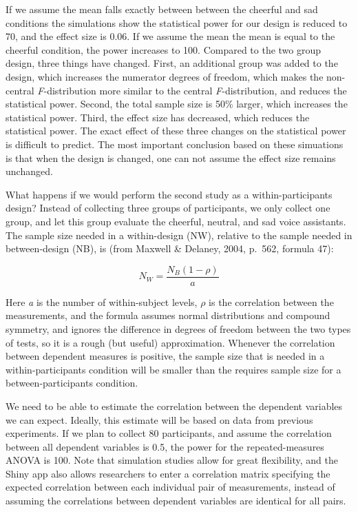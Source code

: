 \documentclass[,man,floatsintext]{apa6}
\begin{document}
If we assume the mean falls exactly between between the cheerful and sad
conditions the simulations show the statistical power for our design is
reduced to 70, and the effect size is 0.06. If we assume the mean the
mean is equal to the cheerful condition, the power increases to 100.
Compared to the two group design, three things have changed. First, an
additional group was added to the design, which increases the numerator
degrees of freedom, which makes the non-central \emph{F}-distribution
more similar to the central \emph{F}-distribution, and reduces the
statistical power. Second, the total sample size is 50\% larger, which
increases the statistical power. Third, the effect size has decreased,
which reduces the statistical power. The exact effect of these three
changes on the statistical power is difficult to predict. The most
important conclusion based on these simuations is that when the design
is changed, one can not assume the effect size remains unchanged.

What happens if we would perform the second study as a
within-participants design? Instead of collecting three groups of
participants, we only collect one group, and let this group evaluate the
cheerful, neutral, and sad voice assistants. The sample size needed in a
within-design (NW), relative to the sample needed in between-design
(NB), is (from Maxwell \& Delaney, 2004, p.~562, formula 47):

\begin{equation}
N_{W}=\frac{N_{B}(1-\rho)}{a}
\end{equation}

Here \emph{a} is the number of within-subject levels, \(\rho\) is the
correlation between the measurements, and the formula assumes normal
distributions and compound symmetry, and ignores the difference in
degrees of freedom between the two types of tests, so it is a rough (but
useful) approximation. Whenever the correlation between dependent
measures is positive, the sample size that is needed in a
within-participants condition will be smaller than the requires sample
size for a between-participants condition.

We need to be able to estimate the correlation between the dependent
variables we can expect. Ideally, this estimate will be based on data
from previous experiments. If we plan to collect 80 participants, and
assume the correlation between all dependent variables is 0.5, the power
for the repeated-measures ANOVA is 100. Note that simulation studies
allow for great flexibility, and the Shiny app also allows researchers
to enter a correlation matrix specifying the expected correlation
between each individual pair of measurements, instead of assuming the
correlations between dependent variables are identical for all pairs.
\end{document}
